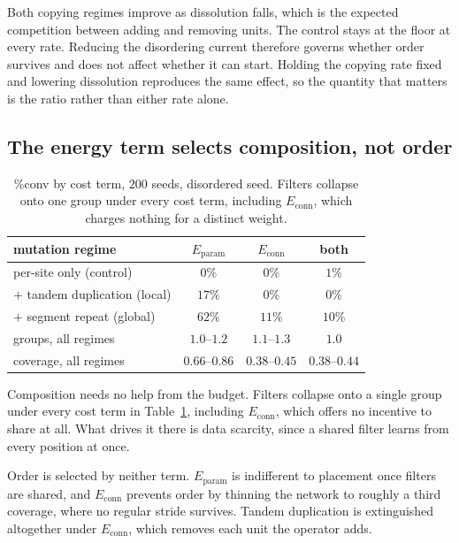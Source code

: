 \documentclass[11pt]{article}
\begin{document}
Both copying regimes improve as dissolution falls, which is the expected competition between adding and
removing units. The control stays at the floor at every rate. Reducing the disordering current therefore
governs whether order survives and does not affect whether it can start. Holding the copying rate fixed
and lowering dissolution reproduces the same effect, so the quantity that matters is the ratio rather
than either rate alone.

\subsection{The energy term selects composition, not order}

\begin{table}[t]
\centering\small
\begin{tabular}{@{}lccc@{}}
\toprule
mutation regime & $E_{\text{param}}$ & $E_{\text{conn}}$ & both \\
\midrule
per-site only (control)        & $0\%$  & $0\%$  & $1\%$ \\
$+$ tandem duplication (local) & $17\%$ & $0\%$  & $0\%$ \\
$+$ segment repeat (global)    & $62\%$ & $11\%$ & $10\%$ \\
\midrule
groups, all regimes            & $1.0$--$1.2$ & $1.1$--$1.3$ & $1.0$ \\
coverage, all regimes          & $0.66$--$0.86$ & $0.38$--$0.45$ & $0.38$--$0.44$ \\
\bottomrule
\end{tabular}
\caption{\%conv by cost term, $200$ seeds, disordered seed. Filters collapse onto one group under every
cost term, including $E_{\text{conn}}$, which charges nothing for a distinct weight.}
\label{tab:energy}
\end{table}

Composition needs no help from the budget. Filters collapse onto a single group under every cost term in
Table~\ref{tab:energy}, including $E_{\text{conn}}$, which offers no incentive to share at all. What
drives it there is data scarcity, since a shared filter learns from every position at once.

Order is selected by neither term. $E_{\text{param}}$ is indifferent to placement once filters are
shared, and $E_{\text{conn}}$ prevents order by thinning the network to roughly a third coverage, where
no regular stride survives. Tandem duplication is extinguished altogether under $E_{\text{conn}}$, which
removes each unit the operator adds.
\end{document}
